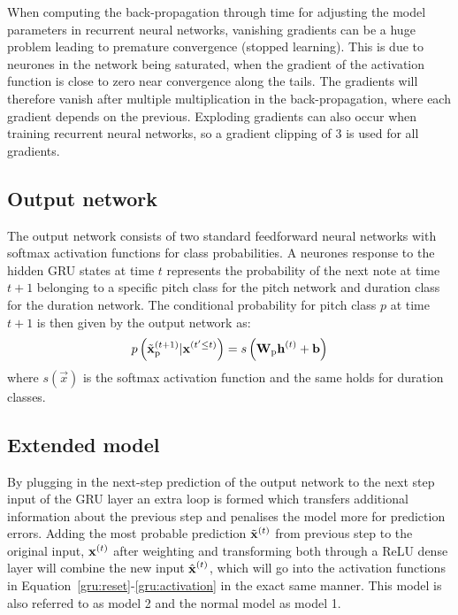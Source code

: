 	When computing the back-propagation through time for adjusting the model parameters in recurrent neural networks, vanishing gradients can be a huge problem leading to premature convergence (stopped learning). This is due to neurones in the network being saturated, when the gradient of the activation function is close to zero near convergence along the tails. The gradients will therefore vanish after multiple multiplication in the back-propagation, where each gradient depends on the previous. 
	Exploding gradients can also occur when training recurrent neural networks, so a gradient clipping of $3$ is used for all gradients.  

\subsection{Output network} %
\label{sub:output_network}
	The output network consists of two standard feedforward neural networks with softmax activation functions for class probabilities. A neurones response to the hidden GRU states at time $t$ represents the probability of the next note at time $t+1$ belonging to a specific pitch class for the pitch network and duration class for the duration network.
	The conditional probability for pitch class $p$ at time $t+1$ is then given by the output network as:
	\begin{equation}
		p\left(\tilde{\vec{x}}\order{t+1}\idx{p}|\vec{x}\order{t'\le t}\right) = s\left(\mat{W}\idx{p} \vec{h}\order{t} + \vec{b}\right)%
	\end{equation}
	where $s(\vec{x})$ is the softmax activation function and the same holds for duration classes. 

	
	\subsection{Extended model} %
	\label{sub:extended_model}
	By plugging in the next-step prediction of the output network to the next step input of the GRU layer an extra loop is formed which transfers additional information about the previous step and penalises the model more for prediction errors.  
	Adding the most probable prediction $\tilde{\bm{\mathrm{x}}}^{(t)}$ from previous step to the original input, $\bm{\mathrm{x}}^{(t)}$ after weighting and transforming both through a ReLU dense layer will combine the new input $\hat{\vec{x}}\order{t}$, which will go into the activation functions in Equation~\eqref{gru:reset}-\eqref{gru:activation} in the exact same manner. This model is also referred to as model 2 and the normal model as model 1.
	
